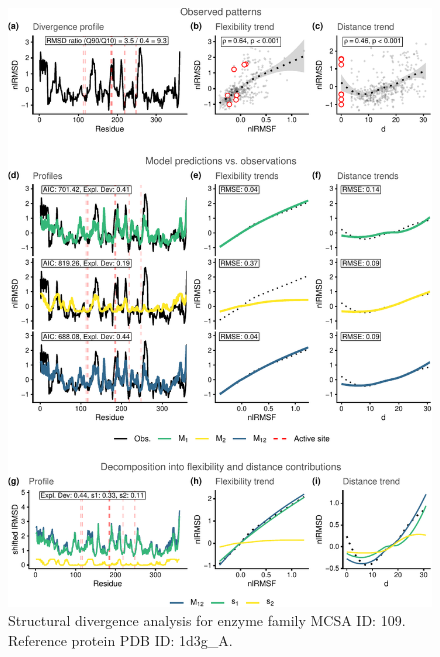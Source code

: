 \documentclass[
]{article}
\begin{document}
\clearpage
\begin{figure}[H]
\centering


\begin{center}\includegraphics{supplementary_material_files/figure-latex/generate_figures-5} \end{center}

\caption{Structural divergence analysis for enzyme family MCSA ID: 109. Reference protein PDB ID: 1d3g\_A.}
\end{figure}
\end{document}
